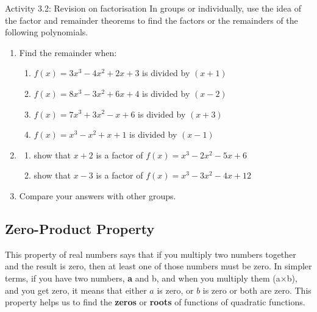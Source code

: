 \begin{activity}{Activity 3.2: Revision on factorisation}
In groups or individually, use the idea of the factor and remainder theorems to
find the factors or the remainders of the following polynomials.
\begin{enumerate}
  \item Find the remainder when:
  \begin{enumerate}
    \item[a.] $f(x) = 3x^3 - 4x^2 + 2x + 3$ is divided by $(x + 1)$
    \item[b.] $f(x) = 8x^3 - 3x^2 + 6x + 4$ is divided by $(x - 2)$
    \item[c.] $f(x) = 7x^3 + 3x^2 - x + 6$ is divided by $(x + 3)$
    \item[d.] $f(x) = x^3 - x^2 + x + 1$ is divided by $(x - 1)$
  \end{enumerate}
  \item
  \begin{enumerate}
    \item[a.] show that $x + 2$ is a factor of $f(x) = x^3 - 2x^2 - 5x + 6$
    \item[b.] show that $x - 3$ is a factor of $f(x) = x^3 - 3x^2 - 4x + 12$
  \end{enumerate}
  \item Compare your answers with other groups.
\end{enumerate}
\end{activity}

\subsection{Zero-Product Property}

This property of real numbers says that if you multiply two numbers together
and the result is zero, then at least one of those numbers must be zero. In simpler
terms, if you have two numbers, \textbf{a} and b, and when you multiply them
(a$\times$b), and you get zero, it means that either $a$ is zero, or $b$ is zero or
both are zero. This property helps us to find the \textbf{zeros} or \textbf{roots} of
functions of quadratic functions.

